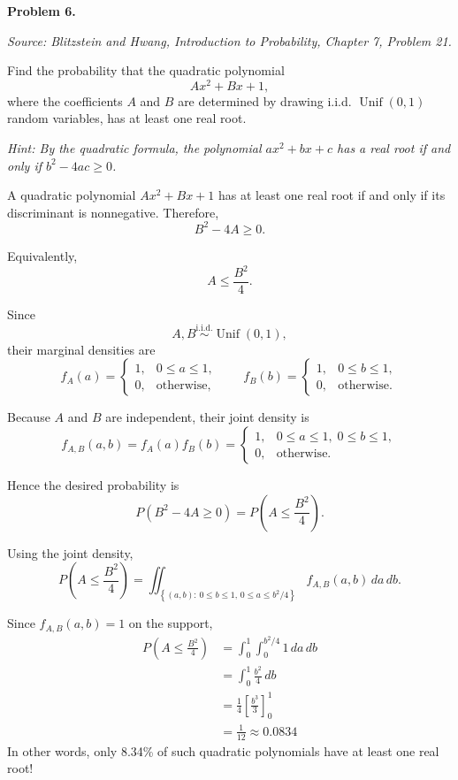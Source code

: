\documentclass[11pt]{article}
\newcommand{\source}[2]{%
    \vspace{0.15cm}
    {\small\textit{Source: Blitzstein and Hwang, \textit{Introduction to Probability}, Chapter #1, Problem #2.}}
}
\begin{document}
\begin{problemheader}
\textbf{Problem 6.}
\end{problemheader}
\source{7}{21}

Find the probability that the quadratic polynomial
$$
Ax^2+Bx+1,
$$
where the coefficients $A$ and $B$ are determined by drawing i.i.d. $\operatorname{Unif}(0,1)$ random variables, has at least one real root.

\emph{Hint: By the quadratic formula, the polynomial $ax^2+bx+c$ has a real root if and only if $b^2-4ac\ge0$.}

\begin{solutionbox}

A quadratic polynomial $Ax^2+Bx+1$ has at least one real root if and only if its discriminant is nonnegative. Therefore,
$$
B^2-4A\ge 0.
$$

Equivalently,
$$
A\le \frac{B^2}{4}.
$$

Since
$$
A,B\overset{\text{i.i.d.}}{\sim}\operatorname{Unif}(0,1),
$$
their marginal densities are
$$
f_A(a)=
\begin{cases}
1, & 0\le a\le 1,\\
0, & \text{otherwise},
\end{cases}
\qquad
f_B(b)=
\begin{cases}
1, & 0\le b\le 1,\\
0, & \text{otherwise}.
\end{cases}
$$

Because $A$ and $B$ are independent, their joint density is
$$
f_{A,B}(a,b)
=
f_A(a)f_B(b)
=
\begin{cases}
1, & 0\le a\le 1,\;0\le b\le 1,\\
0, & \text{otherwise}.
\end{cases}
$$

Hence the desired probability is
$$
P\left(B^2-4A\ge0\right)
=
P\left(A\le \frac{B^2}{4}\right).
$$

Using the joint density,
$$
P\left(A\le \frac{B^2}{4}\right)
=
\iint_{\left\{(a,b):\,0\le b\le1,\,
0\le a\le b^2/4\right\}}
f_{A,B}(a,b)\,da\,db.
$$

Since $f_{A,B}(a,b)=1$ on the support,
$$
\begin{aligned}
P\left(A\le \frac{B^2}{4}\right)
&=
\int_0^1
\int_0^{b^2/4}
1\,da\,db\\
&=
\int_0^1
\frac{b^2}{4}\,db\\
&=
\frac14
\left[\frac{b^3}{3}\right]_0^1\\
&=
\frac{1}{12} \approx 0.0834
\end{aligned}
$$
In other words, only 8.34\% of such quadratic polynomials have at least one real root! 
 

\end{solutionbox}
\newpage
\end{document}
